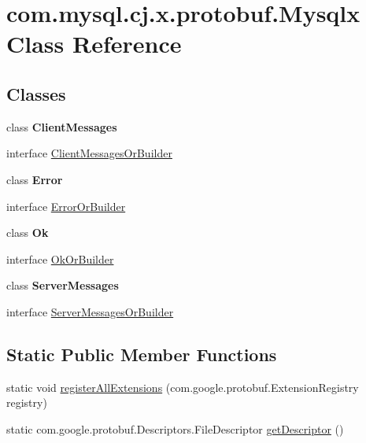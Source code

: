 \hypertarget{classcom_1_1mysql_1_1cj_1_1x_1_1protobuf_1_1_mysqlx}{}\section{com.\+mysql.\+cj.\+x.\+protobuf.\+Mysqlx Class Reference}
\label{classcom_1_1mysql_1_1cj_1_1x_1_1protobuf_1_1_mysqlx}
\subsection*{Classes}
\begin{DoxyCompactItemize}
\item 
class {\bfseries Client\+Messages}
\item 
interface \mbox{\hyperlink{interfacecom_1_1mysql_1_1cj_1_1x_1_1protobuf_1_1_mysqlx_1_1_client_messages_or_builder}{Client\+Messages\+Or\+Builder}}
\item 
class {\bfseries Error}
\item 
interface \mbox{\hyperlink{interfacecom_1_1mysql_1_1cj_1_1x_1_1protobuf_1_1_mysqlx_1_1_error_or_builder}{Error\+Or\+Builder}}
\item 
class {\bfseries Ok}
\item 
interface \mbox{\hyperlink{interfacecom_1_1mysql_1_1cj_1_1x_1_1protobuf_1_1_mysqlx_1_1_ok_or_builder}{Ok\+Or\+Builder}}
\item 
class {\bfseries Server\+Messages}
\item 
interface \mbox{\hyperlink{interfacecom_1_1mysql_1_1cj_1_1x_1_1protobuf_1_1_mysqlx_1_1_server_messages_or_builder}{Server\+Messages\+Or\+Builder}}
\end{DoxyCompactItemize}
\subsection*{Static Public Member Functions}
\begin{DoxyCompactItemize}
\item 
static void \mbox{\hyperlink{classcom_1_1mysql_1_1cj_1_1x_1_1protobuf_1_1_mysqlx_ac5ad1f10543bfb7df0d60b9cb208cc43}{register\+All\+Extensions}} (com.\+google.\+protobuf.\+Extension\+Registry registry)
\item 
static com.\+google.\+protobuf.\+Descriptors.\+File\+Descriptor \mbox{\hyperlink{classcom_1_1mysql_1_1cj_1_1x_1_1protobuf_1_1_mysqlx_a5fc24d044e64d8e06e049b4a4bfae2f2}{get\+Descriptor}} ()
\end{DoxyCompactItemize}
